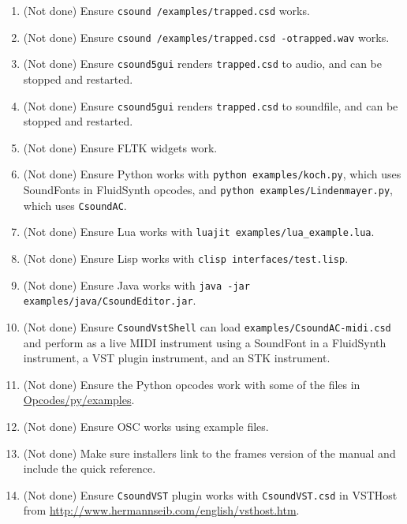 \documentclass[11pt,letterpaper,onecolumn]{scrartcl}
\begin{document}
\begin{sloppypar}
\begin{enumerate}
	\item (Not done) Ensure \texttt{csound /examples/trapped.csd} works.
	\item (Not done) Ensure \texttt{csound /examples/trapped.csd -otrapped.wav} works.
	\item (Not done) Ensure \texttt{csound5gui} renders \texttt{trapped.csd} to audio, and can be stopped and restarted.
	\item (Not done) Ensure \texttt{csound5gui} renders \texttt{trapped.csd} to soundfile, and can be stopped and restarted. 	
	\item (Not done) Ensure FLTK widgets work. 	
	\item (Not done) Ensure Python works with \texttt{python examples/koch.py}, which uses SoundFonts in FluidSynth opcodes, and \texttt{python examples/Lindenmayer.py}, which uses \texttt{CsoundAC}. 
	\item (Not done) Ensure Lua works with \verb|luajit examples/lua_example.lua|.
	\item (Not done) Ensure Lisp works with \verb|clisp interfaces/test.lisp|.
	\item (Not done) Ensure Java works with \verb|java -jar examples/java/CsoundEditor.jar|.
	\item (Not done) Ensure \texttt{CsoundVstShell} can load \texttt{examples/CsoundAC-midi.csd} and perform as a live MIDI instrument using a SoundFont in a FluidSynth instrument, a VST plugin instrument, and an STK instrument.
	\item (Not done) Ensure the Python opcodes work with some of the files in \url{Opcodes/py/examples}.
	\item (Not done) Ensure OSC works using example files.
	\item (Not done) Make sure installers link to the frames version of the manual and include the quick reference.
	\item (Not done) Ensure \texttt{CsoundVST} plugin works with \texttt{CsoundVST.csd} in VSTHost from \url{http://www.hermannseib.com/english/vsthost.htm}.
\end{enumerate}

\end{sloppypar}
\end{document}
